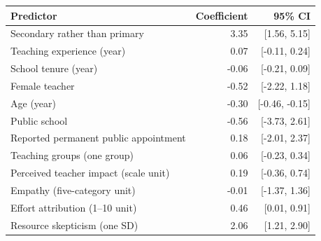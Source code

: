 \begin{tabular}{@{}p{6.0cm}rr@{}}
\toprule
Predictor & Coefficient & 95\% CI \\
\midrule
Secondary rather than primary & 3.35 & [1.56, 5.15] \\
Teaching experience (year) & 0.07 & [-0.11, 0.24] \\
School tenure (year) & -0.06 & [-0.21, 0.09] \\
Female teacher & -0.52 & [-2.22, 1.18] \\
Age (year) & -0.30 & [-0.46, -0.15] \\
Public school & -0.56 & [-3.73, 2.61] \\
Reported permanent public appointment & 0.18 & [-2.01, 2.37] \\
Teaching groups (one group) & 0.06 & [-0.23, 0.34] \\
Perceived teacher impact (scale unit) & 0.19 & [-0.36, 0.74] \\
Empathy (five-category unit) & -0.01 & [-1.37, 1.36] \\
Effort attribution (1--10 unit) & 0.46 & [0.01, 0.91] \\
Resource skepticism (one SD) & 2.06 & [1.21, 2.90] \\
\bottomrule
\end{tabular}
